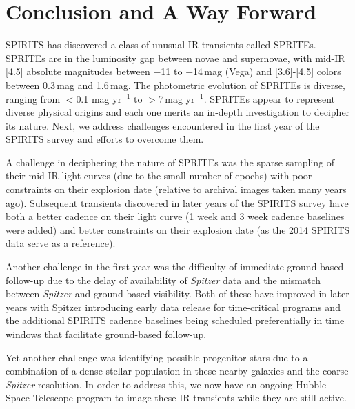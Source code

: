 \documentclass[twocolumn,times]{aastex6}
\begin{document}
\section{Conclusion and A Way Forward}
\label{sec:conclusion}

SPIRITS has discovered a class of unusual IR transients called SPRITEs. SPRITEs are in the luminosity gap between 
novae and supernovae, with mid-IR [4.5] absolute magnitudes between $-$11 to $-$14\,mag (Vega) and [3.6]-[4.5] colors 
between 0.3\,mag and 1.6\,mag. The photometric evolution of SPRITEs is diverse, ranging from $<$0.1 mag yr$^{-1}$ to $>$7\,mag yr$^{-1}$. 
SPRITEs appear to represent diverse physical origins and each one merits an in-depth investigation to decipher its nature.
Next, we address challenges encountered in the first year of the SPIRITS survey and efforts to overcome them. 

A challenge in deciphering the nature of SPRITEs was the sparse sampling of their mid-IR light curves
(due to the small number of epochs) with poor constraints on their explosion date (relative to archival images taken
many years ago). Subsequent transients discovered in later years of the SPIRITS survey have both a
better cadence on their light curve (1 week and 3 week cadence baselines were added) 
and better constraints on their explosion date (as the 2014 SPIRITS data serve as a reference). 

Another challenge in the first year was the difficulty of immediate ground-based follow-up due to the delay of availability of {\it Spitzer}
data and the mismatch between {\it Spitzer} and ground-based visibility. Both of these have improved in later years with 
Spitzer introducing early data release for time-critical programs and the additional SPIRITS
cadence baselines being scheduled preferentially in time windows that facilitate ground-based follow-up.  
 
Yet another challenge was identifying possible progenitor stars due to a combination of 
a dense stellar population in these nearby galaxies and the coarse {\it Spitzer} resolution. In order to address this, 
we now have an ongoing Hubble Space Telescope program to image these IR transients while they
are still active.
\end{document}
